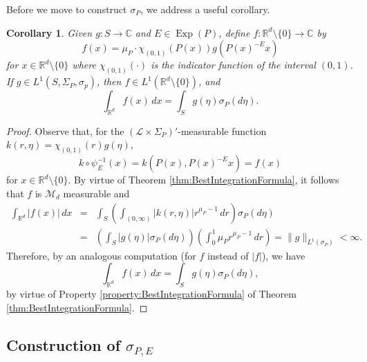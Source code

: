 \documentclass[11pt]{article}
\newtheorem{corollary}[theorem]{Corollary}
\theoremstyle{remark}
\newcommand\Exp{\operatorname{Exp}}
\begin{document}
Before we move to construct $\sigma_P$, we address a useful corollary.  
\begin{corollary}\label{cor:IntegrateOnS}
Given $g:S\to\mathbb{C}$ and $E\in\Exp(P)$, define $f:\mathbb{R}^d\setminus \{0\}\to\mathbb{C}$ by
\begin{equation*}
f(x)=\mu_P\cdot \chi_{(0,1)}(P(x))g(P(x)^{-E}x)
\end{equation*}
for $x\in\mathbb{R}^d\setminus\{0\}$ where $\chi_{(0,1)}(\cdot)$ is the indicator function of the interval $(0,1)$. If $g\in L^1(S,\Sigma_P,\sigma_p)$, then $f\in L^1(\mathbb{R}^d\setminus\{0\})$, and 
\begin{equation*}
    \int_{\mathbb{R}^d}f(x)\,dx=\int_Sg(\eta)\sigma_P(d\eta).
\end{equation*}
\end{corollary}
\begin{proof}
Observe that, for the $(\mathcal{L}\times\Sigma_P)'$-measurable function $k(r,\eta)=\chi_{(0,1)}(r)g(\eta)$,
\begin{equation*}
    k\circ\psi_E^{-1}(x)=k(P(x),P(x)^{-E}x)=f(x)
\end{equation*}
for $x\in\mathbb{R}^d\setminus \{0\}$. By virtue of Theorem \ref{thm:BestIntegrationFormula}, it follows that $f$ is $\mathcal{M}_d$ measurable and 
\begin{eqnarray*}
   \int_{\mathbb{R}^d}|f(x)|\,dx&=&\int_{S}\left(\int_{(0,\infty)}|k(r,\eta)|r^{\mu_P-1}\,dr\right)\sigma_P(d\eta)\\
    &=&\left(\int_S|g(\eta)|\sigma_P(d\eta)\right)\left(\int_0^1 \mu_Pr^{\mu_P-1}\,dr\right)=\|g\|_{L^1(\sigma_P)}<\infty.
\end{eqnarray*}
Therefore, by an analogous computation (for $f$ instead of $|f|$), we have
\begin{equation*}
    \int_{\mathbb{R}^d}f(x)\,dx=\int_S g(\eta)\sigma_P(d\eta),
\end{equation*}
by virtue of Property \ref{property:BestIntegrationFormula} of Theorem \ref{thm:BestIntegrationFormula}. 
\end{proof}










\subsection{Construction of $\sigma_{P,E}$}\label{subsec:ConstructionofSigma}
\end{document}
